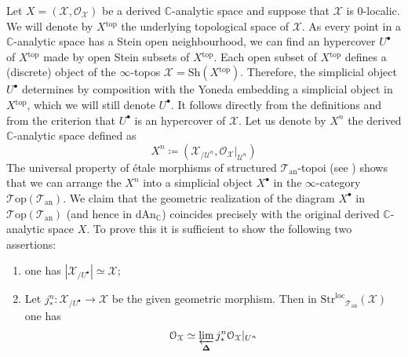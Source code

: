 \documentclass[12pt,a4paper,reqno]{amsart}
\theoremstyle{plain}
\theoremstyle{definition}
\theoremstyle{remark}
\numberwithin{equation}{section}
\begin{document}
Let $X = ({\mathcal X}, {\mathcal O}_{\mathcal X})$ be a derived {$\mathbb C$-analytic\xspace} space and suppose that ${\mathcal X}$ is $0$-localic.
We will denote by $X{^\mathrm{top}}$ the underlying topological space of ${\mathcal X}$.
As every point in a {$\mathbb C$-analytic\xspace} space has a Stein open neighbourhood, we can find an hypercover $U^\bullet$ of $X{^\mathrm{top}}$ made by open Stein subsets of $X{^\mathrm{top}}$.
Each open subset of $X{^\mathrm{top}}$ defines a (discrete) object of the $\infty$-topos ${\mathcal X} = {\mathrm{Sh}}(X{^\mathrm{top}})$.
Therefore, the simplicial object $U^\bullet$ determines by composition with the Yoneda embedding a simplicial object in $X{^\mathrm{top}}$, which we will still denote $U^\bullet$.
It follows directly from the definitions and from the criterion \cite[7.2.1.14]{HTT} that $U^\bullet$ is an hypercover of ${\mathcal X}$.
Let us denote by $X^n$ the derived {$\mathbb C$-analytic\xspace} space defined as
\[ X^n \coloneqq ({\mathcal X}_{/\mathcal U^n}, {\mathcal O}_{\mathcal X}|_{\mathcal U^n}) \]
The universal property of \'etale morphisms of structured ${{\mathcal T}_{\mathrm{an}}}$-topoi (see \cite[Remark 2.3.4]{DAG-V}) shows that we can arrange the $X^n$ into a simplicial object $X^\bullet$ in the $\infty$-category ${\mathcal T\mathrm{op}}({{\mathcal T}_{\mathrm{an}}})$.
We claim that the geometric realization of the diagram $X^\bullet$ in ${\mathcal T\mathrm{op}}({{\mathcal T}_{\mathrm{an}}})$ (and hence in ${\mathrm{dAn}_{\mathbb C}}$) coincides precisely with the original derived {$\mathbb C$-analytic\xspace} space $X$.
To prove this it is sufficient to show the following two assertions:
\begin{enumerate}
	\item one has $|{\mathcal X}_{/U^\bullet}| \simeq {\mathcal X}$;
	\item Let $j^n_* \colon {\mathcal X}_{/U^\bullet} \to {\mathcal X}$ be the given geometric morphism. Then in ${\mathrm{Str}^\mathrm{loc}}_{{\mathcal T}_{\mathrm{an}}}({\mathcal X})$ one has
	\[ {\mathcal O}_{\mathcal X} \simeq \varprojlim_{\mathbf \Delta} j^n_* {\mathcal O}_{\mathcal X} |_{U^n} \]
\end{enumerate}
\end{document}
